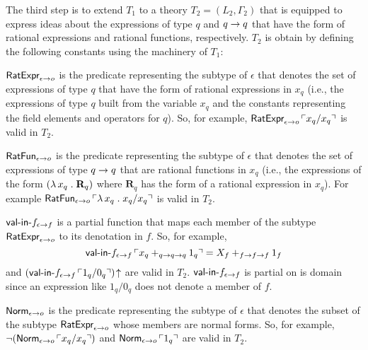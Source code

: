 \documentclass[fleqn]{llncs}
\begin{document}
The third step is to extend $T_1$ to a theory $T_2 = (L_2,\Gamma_2)$
that is equipped to express ideas about the expressions of type $q$
and $q \rightarrow q$ that have the form of rational expressions and
rational functions, respectively.  $T_2$ is obtain by defining
the following constants  using the machinery of $T_1$:

\be

  \item $\mbox{\sf RatExpr}_{\epsilon \rightarrow o}$ is the predicate
    representing the subtype of $\epsilon$ that denotes the set of
    expressions of type $q$ that have the form of rational expressions
    in $x_q$ (i.e., the expressions of type $q$ built from the
    variable $x_q$ and the constants representing the field elements
    and operators for $q$).  So, for example,
    $\mbox{\sf RatExpr}_{\epsilon \rightarrow o} \, \ulcorner x_q/x_q\urcorner$ is
    valid in $T_2$.

  \item $\mbox{\sf RatFun}_{\epsilon \rightarrow o}$ is the predicate
    representing the subtype of $\epsilon$ that denotes the set of
    expressions of type $q \rightarrow q$ that are rational functions in
    $x_q$ (i.e., the expressions of the form $(\lambda\, x_q \mathrel.
    \textbf{R}_q)$ where $\textbf{R}_q$ has the
    form of a rational expression in $x_q$).  For example
    $\mbox{\sf RatFun}_{\epsilon \rightarrow o} \, \ulcorner\lambda\, x_q
      \mathrel. x_q/x_q\urcorner$ is valid in $T_2$.

  \item \bsp $\mbox{\sf val-in-}f_{\epsilon \rightarrow f}$ is a partial
    function that maps each member of the subtype
    $\mbox{\sf RatExpr}_{\epsilon \rightarrow o}$ to its denotation in $f$.
    So, for example, \[\mbox{\sf val-in-}f_{\epsilon \rightarrow f} \,
    \ulcorner x_q +_{q \rightarrow q \rightarrow q} 1_q\urcorner = X_f +_{f \rightarrow f
      \rightarrow f} 1_f\] and $(\mbox{\sf val-in-}f_{\epsilon \rightarrow f} \,
    \ulcorner1_q/0_q\urcorner)\!\uparrow$ are valid in $T_2$. 
    $\mbox{\sf val-in-}f_{\epsilon \rightarrow f}$ is partial on is domain
    since an expression like $1_q/0_q$ does not denote a
    member of $f$. \esp

  \item \bsp $\mbox{\sf Norm}_{\epsilon \rightarrow o}$ is the predicate
    representing the subtype of $\epsilon$ that denotes the subset of
    the subtype $\mbox{\sf RatExpr}_{\epsilon \rightarrow o}$ whose members
    are normal forms.  So, for example, $\neg(\mbox{\sf Norm}_{\epsilon
      \rightarrow o} \, \ulcorner x_q/x_q\urcorner)$ and $\mbox{\sf Norm}_{\epsilon
      \rightarrow o} \, \ulcorner1_q\urcorner$ are valid in $T_2$.\esp
\end{document}
